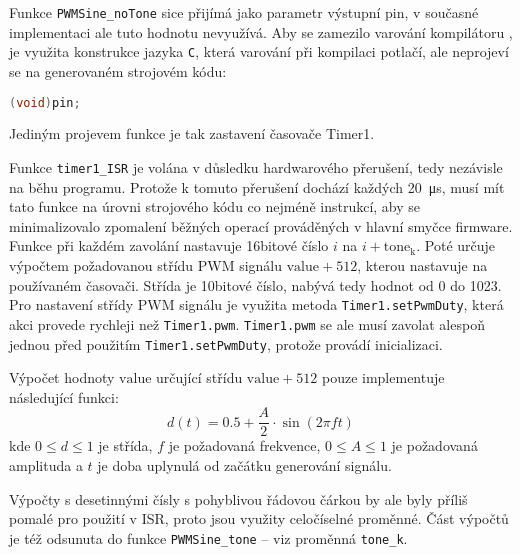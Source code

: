 Funkce \verb|PWMSine_noTone| sice přijímá jako parametr výstupní pin,
v současné implementaci ale tuto hodnotu nevyužívá. Aby se zamezilo varování
kompilátoru  ,
je využita konstrukce jazyka \texttt{C}, která varování při kompilaci potlačí,
ale neprojeví se na generovaném strojovém kódu:
\begin{lstlisting}[language=C]
(void)pin;
\end{lstlisting}
Jediným projevem funkce je tak zastavení časovače Timer1.

Funkce \verb|timer1_ISR| je volána v důsledku hardwarového přerušení,
tedy nezávisle na běhu programu. Protože k tomuto přerušení dochází každých
\SI{20}{\micro\second}, musí mít tato funkce na úrovni strojového kódu co
nejméně instrukcí, aby se minimalizovalo zpomalení běžných operací prováděných
v hlavní smyčce firmware. Funkce při každém zavolání nastavuje 16bitové číslo
$i$ na $i + \mathrm{tone_k}$. Poté určuje výpočtem požadovanou střídu PWM
signálu $\mathrm{value}+512$, kterou nastavuje na používaném časovači. Střída
je 10bitové číslo, nabývá tedy hodnot od \num{0} do \num{1023}. Pro nastavení
střídy PWM signálu je využita metoda \texttt{Timer1.setPwmDuty}, která akci
provede rychleji než \texttt{Timer1.pwm}. \texttt{Timer1.pwm} se ale musí
zavolat alespoň jednou před použitím \texttt{Timer1.setPwmDuty}, protože
provádí inicializaci.~\cite[ověřeno praktickým pokusem]{TimerOnedocs}

Výpočet hodnoty $\mathrm{value}$ určující střídu $\mathrm{value}+512$ pouze
implementuje následující funkci:
\begin{equation}
    d(t) = \num{0,5} + \frac{A}{2} \cdot \sin{(2\pi f t)}
    \label{eq:duty float}
\end{equation}
kde $0 \le d \le 1$ je střída, $f$ je požadovaná frekvence, $0 \le A \le 1$ je
požadovaná amplituda a $t$ je doba uplynulá od začátku generování signálu.

Výpočty s desetinnými čísly s pohyblivou řádovou čárkou by ale byly příliš
pomalé pro použití v ISR, proto jsou využity celočíselné proměnné. Část
výpočtů je též odsunuta do funkce \verb|PWMSine_tone| -- viz proměnná
\verb|tone_k|.

